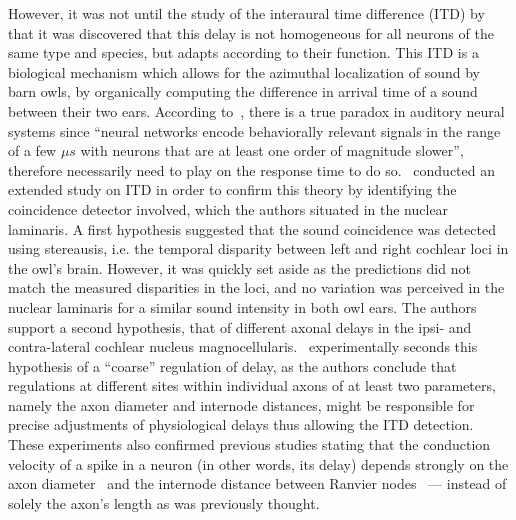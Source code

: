 \documentclass[brainsci, %
               review,submit,pdftex,moreauthors
               ]{Definitions/mdpi}
\begin{document}
However, it was not until the study of the interaural time difference (ITD) by~\citet{gerstner_neuronal_1996} that it was discovered that this delay is not homogeneous for all neurons of the same type and species, but adapts according to their function. This ITD is a biological mechanism which allows for the azimuthal localization of sound by barn owls, by organically computing the difference in arrival time of a sound between their two ears. According to~\citep{gerstner_neuronal_1996}, there is a true paradox in auditory neural systems since “neural networks encode behaviorally relevant signals in the range of a few $\mu s$ with neurons that are at least one order of magnitude slower”, therefore necessarily need to play on the response time to do so.~\citet{pena_cochlear_2001} conducted an extended study on ITD in order to confirm this theory by identifying the coincidence detector involved, which the authors situated in the nuclear laminaris. A first hypothesis suggested that the sound coincidence was detected using stereausis, i.e. the temporal disparity between left and right cochlear loci in the owl's brain. However, it was quickly set aside as the predictions did not match the measured disparities in the loci, and no variation was perceived in the nuclear laminaris for a similar sound intensity in both owl ears. The authors support a second hypothesis, that of different axonal delays in the ipsi- and contra-lateral cochlear nucleus magnocellularis.~\citet{seidl_mechanisms_2010} experimentally seconds this hypothesis of a ``coarse'' regulation of delay, as the authors conclude that regulations at different sites within individual axons of at least two parameters, namely the axon diameter and internode distances, might be responsible for precise adjustments of physiological delays thus allowing the ITD detection. These experiments also confirmed previous studies stating that the conduction velocity of a spike in a neuron (in other words, its delay) depends strongly on the axon diameter~\citep{gasser_axon_1939} and the internode distance between Ranvier nodes~\citep{brill_conduction_1977} --- instead of solely the axon's length as was previously thought.

\end{document}
